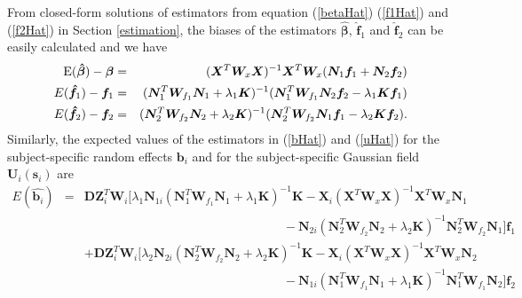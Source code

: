 \documentclass[12pt, notitlepage]{article}
\begin{document}
From closed-form solutions of estimators from equation (\ref{betaHat}) (\ref{f1Hat}) and (\ref{f2Hat}) in Section \ref{estimation}, the biases of the estimators $\boldsymbol {\hat \beta}$, $\boldsymbol {\hat f}_1$ and 
$\boldsymbol {\hat f}_2$ can be easily calculated and we have
\begin{eqnarray*}
{\rm E}(\boldsymbol {\hat \beta})  -  \boldsymbol \beta
&=&
 (\boldsymbol X^T  \boldsymbol W_x \boldsymbol X )^{-1} \boldsymbol X^T  \boldsymbol W_x  (\boldsymbol N_1 \boldsymbol f_1
 +
  \boldsymbol N_2 \boldsymbol f_2) \\
E(\boldsymbol {\hat f}_1) - \boldsymbol f_1  
&=&
(\boldsymbol N_1^T \boldsymbol W_{f_1}  \boldsymbol N_1 
+ \lambda_1 \boldsymbol K)^{-1}  
  ( \boldsymbol N_1^T \boldsymbol W_{f_1}
  \boldsymbol N_2 \boldsymbol f_2 - \lambda_1    \boldsymbol K \boldsymbol f_1) \\
E(\boldsymbol {\hat f}_2) - \boldsymbol f_2  
&=&
(\boldsymbol N_2^T \boldsymbol W_{f_2}  \boldsymbol N_2 
+ \lambda_2 \boldsymbol K)^{-1}  
 (\boldsymbol N_2^T \boldsymbol W_{f_2} \boldsymbol N_1 \boldsymbol f_1 
  -  \lambda_2    \boldsymbol K \boldsymbol f_2).
\end{eqnarray*}
Similarly,  the expected values of the estimators in (\ref{bHat}) and (\ref{uHat}) for the subject-specific random effects $\boldsymbol b_i$ and for the subject-specific Gaussian field $\boldsymbol U_i(\boldsymbol s_i)$
 are 
\begin{eqnarray*}
E(\hat {\boldsymbol b_i}) 
&=& 
\boldsymbol D \boldsymbol Z_i^T \boldsymbol W_i 
[
\lambda_1 \boldsymbol N_{1i}
 (\boldsymbol N_1^T \boldsymbol W_{f_1}  \boldsymbol N_1 + \lambda_1 \boldsymbol K)^{-1}  
\boldsymbol K
-  
\boldsymbol X_i(\boldsymbol X^T  \boldsymbol W_x \boldsymbol X )^{-1} \boldsymbol X^T  \boldsymbol W_x  \boldsymbol N_1
\\
&& 
\quad\quad\quad\quad \quad \quad \quad \quad \quad \quad \quad \quad \quad \quad\quad \quad
-
 \boldsymbol N_{2i}
(\boldsymbol N_2^T \boldsymbol W_{f_2}  \boldsymbol N_2 + \lambda_2 \boldsymbol K)^{-1}  \boldsymbol N_2^T \boldsymbol W_{f_2} 
\boldsymbol N_{1} 
 ]
  \boldsymbol f_1  
\\
&& 
+
\boldsymbol D \boldsymbol Z_i^T \boldsymbol W_i 
[
\lambda_2 \boldsymbol N_{2i}
(\boldsymbol N_2^T \boldsymbol W_{f_2}  \boldsymbol N_2 + \lambda_2 \boldsymbol K)^{-1}
  \boldsymbol K
-  
\boldsymbol X_i(\boldsymbol X^T  \boldsymbol W_x \boldsymbol X )^{-1} \boldsymbol X^T  \boldsymbol W_x  \boldsymbol N_2
\\
&& 
\quad\quad\quad\quad \quad \quad \quad \quad \quad \quad \quad \quad \quad \quad\quad \quad
-
 \boldsymbol N_{1i}
 (\boldsymbol N_1^T \boldsymbol W_{f_1}  \boldsymbol N_1 + \lambda_1 \boldsymbol K)^{-1}  
\boldsymbol N_1^T \boldsymbol W_{f_1}
\boldsymbol N_2
 ]
  \boldsymbol f_2 \\
  \end{eqnarray*}
\end{document}
